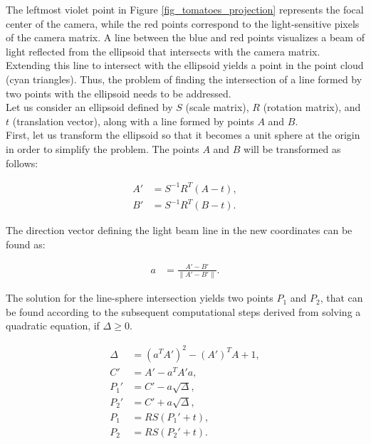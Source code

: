 The leftmost violet point in Figure \ref{fig_tomatoes_projection} represents the focal center of the camera, while the red points correspond to the light-sensitive pixels of the camera matrix. 
A line between the blue and red points visualizes a beam of light reflected from the ellipsoid that intersects with the camera matrix.
Extending this line to intersect with the ellipsoid yields a point in the point cloud (cyan triangles). 
Thus, the problem of finding the intersection of a line formed by two points with the ellipsoid needs to be addressed. \\

Let us consider an ellipsoid defined by $S$ (scale matrix), $R$ (rotation matrix), and $t$ (translation vector), 
along with a line formed by points $A$ and $B$. \\

First, let us transform the ellipsoid so that it becomes a unit sphere at the origin in order to simplify the problem.
The points $A$ and $B$ will be transformed as follows:

\begin{align*}
A' &= S^{-1} R^T (A - t), \\
B' &= S^{-1} R^T (B - t).
\tag{19}
\end{align*}

The direction vector defining the light beam line in the new coordinates can be found as:

\begin{align*}
a &= \frac{A' - B'}{\|A' - B'\|}.
\tag{20}
\end{align*}

The solution for the line-sphere intersection yields two points $P_1$ and $P_2$, that can be found according to the subsequent computational steps derived from solving a quadratic equation, if $\Delta \geq 0$.

\begin{align*}
\Delta & = (a^T A')^2 - (A')^T A  + 1, \\
C' & = A' - a^T A' a, \\
P_1' & = C' - a \sqrt{\Delta}, \\
P_2' & = C' + a \sqrt{\Delta}, \\
P_1 & =  R S (P_1' + t), \\
P_2 & =  R S (P_2' + t). \\
\tag{21}
\end{align*}

